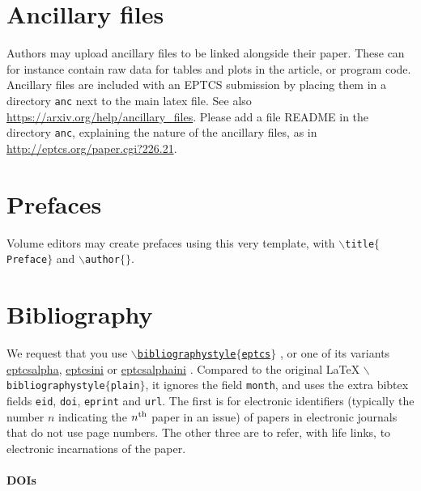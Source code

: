 \documentclass[submission,copyright,creativecommons]{eptcs}
\begin{document}
\section{Ancillary files}

Authors may upload ancillary files to be linked alongside their paper.
These can for instance contain raw data for tables and plots in the
article, or program code.  Ancillary files are included with an EPTCS
submission by placing them in a directory \texttt{anc} next to the
main latex file. See also \url{https://arxiv.org/help/ancillary_files}.
Please add a file README in the directory \texttt{anc}, explaining the
nature of the ancillary files, as in
\url{http://eptcs.org/paper.cgi?226.21}.

\section{Prefaces}

Volume editors may create prefaces using this very template,
with {\tt $\backslash$title$\{$Preface$\}$} and {\tt $\backslash$author$\{\}$}.

\section{Bibliography}

We request that you use
\href{http://eptcs.web.cse.unsw.edu.au/eptcs.bst}
{\tt $\backslash$bibliographystyle$\{$eptcs$\}$}
\cite{bibliographystylewebpage}, or one of its variants
\href{http://eptcs.web.cse.unsw.edu.au/eptcsalpha.bst}{eptcsalpha},
\href{http://eptcs.web.cse.unsw.edu.au/eptcsini.bst}{eptcsini} or
\href{http://eptcs.web.cse.unsw.edu.au/eptcsalphaini.bst}{eptcsalphaini}
\cite{bibliographystylewebpage}. Compared to the original {\LaTeX}
{\tt $\backslash$biblio\-graphystyle$\{$plain$\}$},
it ignores the field {\tt month}, and uses the extra
bibtex fields {\tt eid}, {\tt doi}, {\tt eprint} and {\tt url}.
The first is for electronic identifiers (typically the number $n$
indicating the $n^{\rm th}$ paper in an issue) of papers in electronic
journals that do not use page numbers. The other three are to refer,
with life links, to electronic incarnations of the paper.

\paragraph{DOIs}
\end{document}
